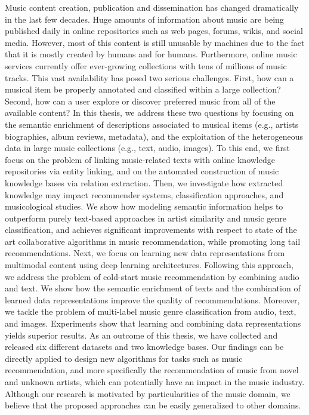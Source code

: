 Music content creation, publication and dissemination has changed dramatically in the last few decades. Huge amounts of information about music are being published daily in online repositories such as web pages, forums, wikis, and social media. However, most of this content is still unusable by machines due to the fact that it is mostly created by humans and for humans. Furthermore, online music services currently offer ever-growing collections with tens of millions of music tracks. This vast availability has posed two serious challenges. First, how can a musical item be properly annotated and classified within a large collection? Second, how can a user explore or discover preferred music from all of the available content? In this thesis, we address these two questions by focusing on the semantic enrichment of descriptions associated to musical items (e.g., artists biographies, album reviews, metadata), and the exploitation of the heterogeneous data in large music collections (e.g., text, audio, images). To this end, we first focus on the problem of linking music-related texts with online knowledge repositories via entity linking, and on the automated construction of music knowledge bases via relation extraction. Then, we investigate how extracted knowledge may impact recommender systems, classification approaches, and musicological studies. We show how modeling semantic information helps to outperform purely text-based approaches in artist similarity and music genre classification, and achieves significant improvements with respect to state of the art collaborative algorithms in music recommendation, while promoting long tail recommendations. Next, we focus on learning new data representations from multimodal content using deep learning architectures. Following this approach, we address the problem of cold-start music recommendation by combining audio and text. We show how the semantic enrichment of texts and the combination of learned data representations improve the quality of recommendations. Moreover, we tackle the problem of multi-label music genre classification from audio, text, and images. Experiments show that learning and combining data representations yields superior results. As an outcome of this thesis, we have collected and released six different datasets and two knowledge bases. Our findings can be directly applied to design new algorithms for tasks such as music recommendation, and more specifically the recommendation of music from novel and unknown artists, which can potentially have an impact in the music industry. Although our research is motivated by particularities of the music domain, we believe that the proposed approaches can be easily generalized to other domains.
